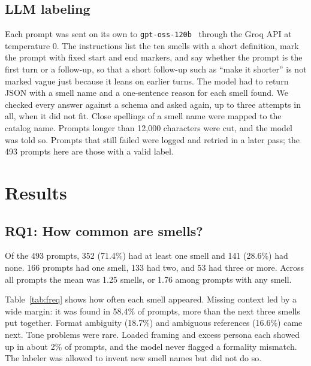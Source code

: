 \documentclass[conference]{IEEEtran}
\begin{document}
\subsection{LLM labeling}
Each prompt was sent on its own to \texttt{gpt-oss-120b}~\cite{gptoss} through
the Groq API at temperature 0. The instructions list the ten smells with a short
definition, mark the prompt with fixed start and end markers, and say whether the
prompt is the first turn or a follow-up, so that a short follow-up such as
``make it shorter'' is not marked vague just because it leans on earlier turns.
The model had to return JSON with a smell name and a one-sentence reason for each
smell found. We checked every answer against a schema and asked again, up to three
attempts in all, when it did not fit. Close spellings of a smell name were mapped
to the catalog name. Prompts longer than 12,000 characters were cut, and the model
was told so. Prompts that still failed were logged and retried in a later pass;
the 493 prompts here are those with a valid label.

\section{Results}
\subsection{RQ1: How common are smells?}
Of the 493 prompts, 352 (71.4\%) had at least one smell and 141 (28.6\%) had none.
166 prompts had one smell, 133 had two, and 53 had three or more. Across all
prompts the mean was 1.25 smells, or 1.76 among prompts with any smell.

Table~\ref{tab:freq} shows how often each smell appeared. Missing context led by a
wide margin: it was found in 58.4\% of prompts, more than the next three smells
put together. Format ambiguity (18.7\%) and ambiguous references (16.6\%) came
next. Tone problems were rare. Loaded framing and excess persona each showed up in
about 2\% of prompts, and the model never flagged a formality mismatch. The
labeler was allowed to invent new smell names but did not do so.
\end{document}
